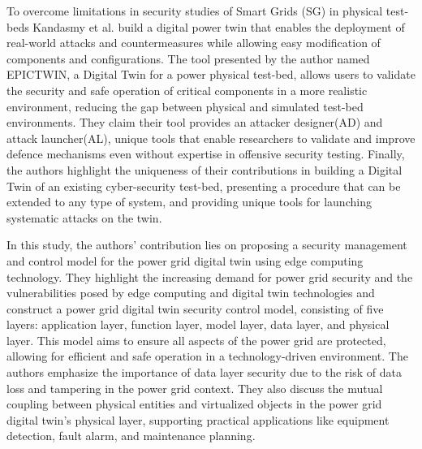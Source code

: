 To overcome limitations in security studies of Smart Grids (SG) in physical test-beds Kandasmy et al.\cite{kandasamyElectricPowerDigital2022} build a digital power twin that enables the deployment of real-world attacks and countermeasures while allowing easy modification of components and configurations. The tool presented by the author named EPICTWIN, a Digital Twin for a power physical test-bed, allows users to validate the security and safe operation of critical components in a more realistic environment, reducing the gap between physical and simulated test-bed environments. They claim their tool provides an attacker designer(AD) and attack launcher(AL), unique tools that enable researchers to validate and improve defence mechanisms even without expertise in offensive security testing. Finally, the authors highlight the uniqueness of their contributions in building a Digital Twin of an existing cyber-security test-bed, presenting a procedure that can be extended to any type of system, and providing unique tools for launching systematic attacks on the twin.

In \cite{sunResearchSecurityManagement2021a} this study, the authors' contribution lies on proposing a security management and control model for the power grid digital twin using edge computing technology. They highlight the increasing demand for power grid security and the vulnerabilities posed by edge computing and digital twin technologies and construct a power grid digital twin security control model, consisting of five layers: application layer, function layer, model layer, data layer, and physical layer. This model aims to ensure all aspects of the power grid are protected, allowing for efficient and safe operation in a technology-driven environment. The authors emphasize the importance of data layer security due to the risk of data loss and tampering in the power grid context. They also discuss the mutual coupling between physical entities and virtualized objects in the power grid digital twin's physical layer, supporting practical applications like equipment detection, fault alarm, and maintenance planning.


